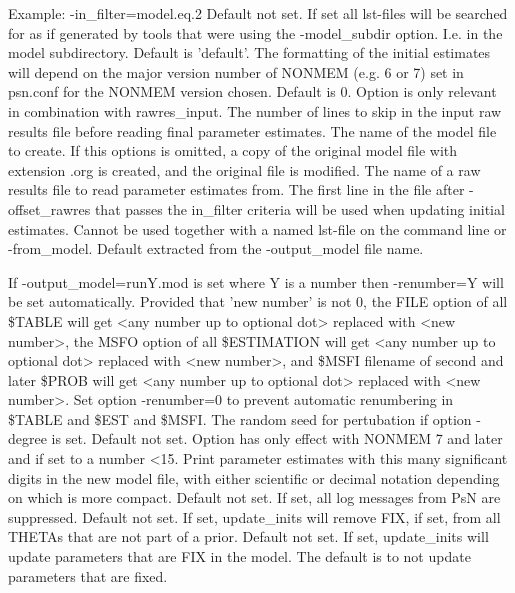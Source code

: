 \begin{optionlist}
Example: -in\_filter=model.eq.2
\nextopt
{}
Default not set. If set all lst-files will be searched for as if generated
by tools that were using the -model\_subdir option. I.e. in the model
subdirectory.
\nextopt
{}
Default is 'default'. The formatting of the initial estimates will depend on the major version number of NONMEM (e.g. 6 or 7) set in psn.conf for the NONMEM version chosen.
\nextopt
{}
Default is 0. Option is only relevant in combination with rawres\_input. The number of lines to skip in the input raw results file before reading final parameter estimates.
\nextopt
{}
The name of the model file to create. If this options is omitted, a copy of the original model file with extension .org is created, and the original file is modified.
\nextopt
{}
The name of a raw results file to read parameter estimates from. The first line in the file after -offset\_rawres that passes the in\_filter criteria will be used when updating initial estimates. Cannot be used together with a named lst-file on the command line or -from\_model.
\nextopt
{}
Default extracted from the -output\_model file name. 

If -output\_model=runY.mod is set where Y is a number then -renumber=Y will be set automatically. Provided that 'new number' is not 0, the FILE option of all \$TABLE will get <any number up to optional dot> replaced with <new number>, the MSFO option of all \$ESTIMATION will get <any number up to optional dot> replaced with <new number>, and \$MSFI filename of second and later \$PROB will get <any number up to optional dot> replaced with <new number>. Set option -renumber=0 to prevent automatic renumbering in \$TABLE and \$EST and \$MSFI.
\nextopt
{}
The random seed for pertubation if option -degree is set.
\nextopt
{}
Default not set. Option has only effect with NONMEM 7 and later and if set to a number <15. Print parameter estimates with this many significant digits in the new model file, with either scientific or decimal notation depending on which is more compact.
\nextopt
{}
Default not set. If set, all log messages from PsN are suppressed.
\nextopt
{}
Default not set. If set, update\_inits will remove FIX, if set, from all THETAs that are not part of a prior.
\nextopt
{}
Default not set. If set, update\_inits will update parameters that are FIX in the model. The default is to not update parameters that are fixed.
\nextopt
\end{optionlist}


